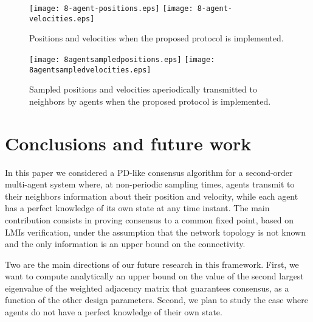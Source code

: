 \documentclass[conference]{IEEEtran}
\begin{document}
\begin{figure}
\centering
\texttt{[image: 8-agent-positions.eps]}
\texttt{[image: 8-agent-velocities.eps]}
\caption{Positions and velocities when the proposed protocol is implemented.}
\label{fig:8-agent-positions}
\end{figure}

\begin{figure}
\centering
\texttt{[image: 8agentsampledpositions.eps]}
\texttt{[image: 8agentsampledvelocities.eps]}
\caption{Sampled positions and velocities aperiodically transmitted to neighbors by agents when the proposed protocol is implemented.}
\label{fig:8-agent-sampled velocities}
\end{figure}





\section{Conclusions and future work}\label{conclusions}


In this paper we considered a PD-like consensus algorithm for a second-order multi-agent system where, at non-periodic sampling times, agents transmit to their neighbors information about their position and velocity, while each agent has a perfect knowledge of its own state at any time instant.
The main contribution consists in proving consensus to a common fixed point, based on LMIs verification, under the assumption that the network topology is not known and the only information is an upper bound on the connectivity.

Two are the main directions of our future research in this framework.
First, we want to compute analytically an upper bound on the value of the second largest eigenvalue of the weighted adjacency matrix that guarantees consensus, as a function of the other design parameters. Second, we plan to study the case where agents do not have a perfect knowledge of their own state.






\end{document}
